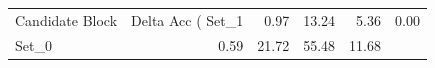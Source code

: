 \begin{tabular}{lrrrr}
\toprule
Candidate Block & Delta Acc (%
\midrule
Set_1 & 0.97 & 13.24 & 5.36 & 0.00 \\
Set_0 & 0.59 & 21.72 & 55.48 & 11.68 \\
\bottomrule
\end{tabular}
